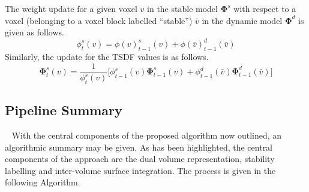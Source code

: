 The weight update for a given voxel \(v\) in the stable model \(\bm{\Phi}^{s}\)
with respect to a voxel (belonging to a voxel block labelled ``stable'') 
\(\bar{v}\) in the dynamic model \(\bm{\Phi}^{d}\) is given as follows.
\begin{equation}
  \label{eqn:moseg_weight_update}
  \phi^{s}_{t}(v) = \phi{(v)}^{s}_{t-1}(v) + \phi{(\bar{v})}^{d}_{t-1}(\bar{v})
\end{equation}
Similarly, the update for the TSDF values is as follows.
\begin{equation}
  \label{eqn:moseg_sdf_update}
  \bm{\Phi}^{s}_{t}(v) = \frac{1}{\phi^{s}_{t}(v)} \bigg[
  \phi^{s}_{t-1}(v) \bm{\Phi}^{s}_{t-1}(v) +
  \phi^{d}_{t-1}(\bar{v}) \bm{\Phi}^{d}_{t-1}(\bar{v})
  \bigg]
\end{equation}

\subsection{Pipeline Summary}
~\label{subsec:moseg_pipeline_summary}
With the central components of the proposed algorithm now outlined, an algorithmic 
summary may be given. As has been highlighted, the central components of the approach 
are the dual volume representation, stability labelling and inter-volume surface 
integration. The process is given in the following Algorithm.

